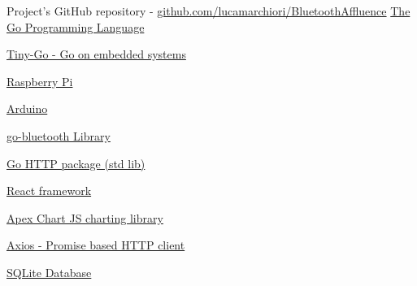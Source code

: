 \documentclass[a4paper, 11pt]{article}
\begin{document}
\newpage
\begin{thebibliography}{9}
Project's GitHub repository - \href{https://github.com/lucamarchiori/BluetoothAffluence}{github.com/lucamarchiori/BluetoothAffluence}
\href{https://go.dev/}{The Go Programming Language}

\href{https://tinygo.org/}{Tiny-Go - Go on embedded systems}

\href{https://www.raspberrypi.com/documentation/computers/raspberry-pi.html}{Raspberry Pi}

\href{https://docs.arduino.cc/}{Arduino}

\href{https://pkg.go.dev/github.com/muka/go-bluetooth@v0.0.0-20221213043340-85dc80edc4e1#section-readme}{go-bluetooth Library}

\href{https://pkg.go.dev/net/http}{Go HTTP package (std lib)}

\href{https://react.dev/}{React framework}

\href{https://apexcharts.com/}{Apex Chart JS charting library}

\href{https://axios-http.com/}{Axios - Promise based HTTP client}

\href{https://www.sqlite.org/index.html}{SQLite Database}
\end{thebibliography}
\end{document}
